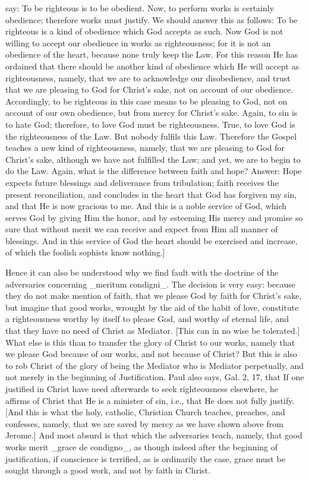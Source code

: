 say: To be righteous is to be obedient.  Now, to perform works is
certainly obedience; therefore works must justify.  We should answer
this as follows: To be righteous is a kind of obedience which God
accepts as such.  Now God is not willing to accept our obedience in
works as righteousness; for it is not an obedience of the heart,
because none truly keep the Law.  For this reason He has ordained
that there should be another kind of obedience which He will accept
as righteousness, namely, that we are to acknowledge our disobedience,
and trust that we are pleasing to God for Christ's sake, not on
account of our obedience.  Accordingly, to be righteous in this case
means to be pleasing to God, not on account of our own obedience, but
from mercy for Christ's sake.  Again, to sin is to hate God;
therefore, to love God must be righteousness.  True, to love God is
the righteousness of the Law.  But nobody fulfils this Law.
Therefore the Gospel teaches a new kind of righteousness, namely,
that we are pleasing to God for Christ's sake, although we have not
fulfilled the Law; and yet, we are to begin to do the Law.  Again,
what is the difference between faith and hope?  Answer: Hope expects
future blessings and deliverance from tribulation; faith receives the
present reconciliation, and concludes in the heart that God has
forgiven my sin, and that He is now gracious to me.  And this is a
noble service of God, which serves God by giving Him the honor, and
by esteeming His mercy and promise so sure that without merit we can
receive and expect from Him all manner of blessings.  And in this
service of God the heart should be exercised and increase, of which
the foolish sophists know nothing.]

Hence it can also be understood why we find fault with the doctrine
of the adversaries concerning _meritum condigni_.  The decision is
very easy: because they do not make mention of faith, that we please
God by faith for Christ's sake, but imagine that good works, wrought
by the aid of the habit of love, constitute a righteousness worthy by
itself to please God, and worthy of eternal life, and that they have
no need of Christ as Mediator.  [This can in no wise be tolerated.]
What else is this than to transfer the glory of Christ to our works,
namely that we please God because of our works, and not because of
Christ?  But this is also to rob Christ of the glory of being the
Mediator who is Mediator perpetually, and not merely in the beginning
of Justification.  Paul also says, Gal. 2, 17, that If one justified
in Christ have need afterwards to seek righteousness elsewhere, he
affirms of Christ that He is a minister of sin, i.e., that He does
not fully justify.  [And this is what the holy, catholic, Christian
Church teaches, preaches, and confesses, namely, that we are saved by
mercy as we have shown above from Jerome.] And most absurd is that
which the adversaries teach, namely, that good works merit _grace de
condigno_, as though indeed after the beginning of justification, if
conscience is terrified, as is ordinarily the case, grace must be
sought through a good work, and not by faith in Christ.


